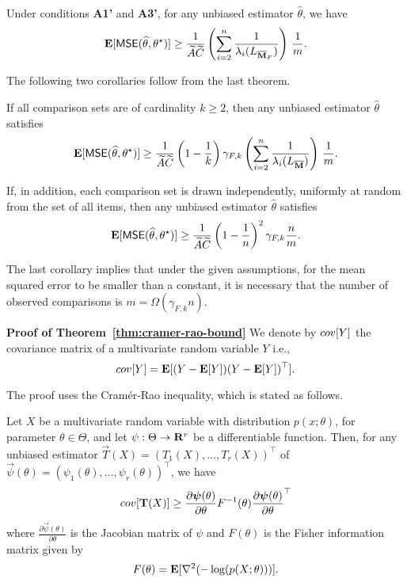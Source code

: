 \begin{theorem} Under conditions {\bf A1'} and {\bf A3'}, for any unbiased estimator $\widehat \theta$, we have
$$
\mathbf{E}[\hbox{\textup{\textsf{MSE}}}(\widehat{\theta},\theta^\star)] \ge \frac{1}{\widetilde{A}\widetilde{C}} \left(\sum_{i=2}^n\frac{1}{\lambda_i(L_{\overline{\mathbf{M}}_F})}\right)\, \frac{1}{m}. 
$$ 
\label{thm:cramer-rao-bound}
\end{theorem}

The following two corollaries follow from the last theorem.

\begin{corollary} If all comparison sets are of cardinality $k\geq 2$, then any unbiased estimator $\widehat \theta$ satisfies
$$
\mathbf{E}[\hbox{\textup{\textsf{MSE}}}(\widehat{\theta},\theta^\star)] \ge \frac{1}{\widetilde{A}\widetilde{C}}\left(1-\frac{1}{k}\right)\gamma_{F,k} \left(\sum_{i=2}^n\frac{1}{\lambda_i(L_{\overline{\mathbf{M}}})}\right)\, \frac{1}{m}. 
$$ 
\end{corollary}

\begin{corollary} If, in addition, each comparison set is drawn independently, uniformly at random from the set of all items, then any unbiased estimator $\widehat \theta$ satisfies 
$$
\mathbf{E}[\hbox{\textup{\textsf{MSE}}}(\widehat{\theta},\theta^\star)] \ge \frac{1}{\widetilde{A}\widetilde{C}} \left(1-\frac{1}{n}\right)^2 \gamma_{F,k} \frac{n}{m}. 
$$
\end{corollary}

The last corollary implies that under the given assumptions, for the mean squared error to be smaller than a constant, it is necessary that the number of observed comparisons is $m =\Omega(\gamma_{F,k} n)$.

{\bf Proof of Theorem~\ref{thm:cramer-rao-bound}} We denote by  $cov[Y]$ the covariance matrix  of a multivariate random variable $Y$ i.e.,
$$
cov[Y] = \mathbf{E}[(Y-\mathbf{E}[Y])(Y-\mathbf{E}[Y])^\top].
$$

The proof uses the Cram\'{e}r-Rao inequality, which is stated as follows.

\begin{lemma} Let $X$ be a multivariate random variable with distribution $p(x;\theta)$, for parameter $\theta \in \Theta$, and let $\psi: \Theta \rightarrow \mathbf{R}^r$ be a differentiable function. Then, for any unbiased estimator $\vec{T}(X) = (T_1 (X), \dots, T_r (X) )^\top$ of $\vec{\psi}(\theta) = (\psi_1 (\theta), \dots, \psi_r (\theta ) )^\top$, we have
$$
cov[\mathbf{T}(X)] \ge \frac{\partial \boldsymbol{\psi}(\theta)}{\partial \theta} F^{-1}(\theta) \frac{\partial \boldsymbol{\psi}(\theta)}{\partial \theta}^\top
$$
where $\frac{\partial \vec{\psi}(\theta)}{\partial \theta}$ is the Jacobian matrix of $\psi$ and $F(\theta)$ is the Fisher information matrix given by
$$
F(\theta) = \mathbf{E}[\nabla^2(-\log(p(X;\theta)))].
$$
\label{prop:cramer}
\end{lemma}


